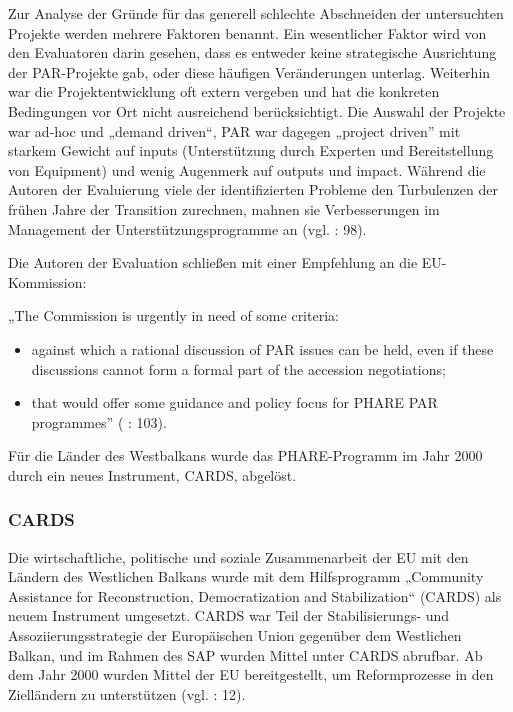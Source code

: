 Zur Analyse der Gründe für das generell schlechte Abschneiden der untersuchten Projekte werden mehrere Faktoren benannt. Ein wesentlicher Faktor wird von den Evaluatoren darin gesehen, dass es entweder keine strategische Ausrichtung der PAR-Projekte gab, oder diese häufigen Veränderungen unterlag. Weiterhin war die Projektentwicklung oft extern vergeben und hat die konkreten Bedingungen vor Ort nicht ausreichend berücksichtigt. Die Auswahl der Projekte war ad-hoc und „demand driven“, PAR war dagegen „project driven” mit starkem Gewicht auf inputs (Unterstützung durch Experten und Bereitstellung von Equipment) und wenig Augenmerk auf outputs und impact. Während die Autoren der Evaluierung viele der identifizierten Probleme den Turbulenzen der frühen Jahre der Transition zurechnen, mahnen sie Verbesserungen im Management der Unterstützungsprogramme an (vgl. \cite{ips} : 98).

Die Autoren der Evaluation schließen mit einer Empfehlung an die EU-Kommission: 

„The Commission is urgently in need of some criteria:
\begin{itemize}
\item against which a rational discussion of PAR issues can be held, even if these discussions cannot form a formal part of the accession negotiations;
\item that would offer some guidance and policy focus for PHARE PAR programmes” (\cite{ips} : 103).
\end{itemize}
Für die Länder des Westbalkans wurde das PHARE-Programm im Jahr 2000 durch ein neues Instrument, CARDS, abgelöst.


\subsubsection{CARDS} 

Die wirtschaftliche, politische und soziale Zusammenarbeit der EU mit den Ländern des Westlichen Balkans wurde mit dem Hilfsprogramm „Community Assistance for Reconstruction, Democratization and Stabilization“ (CARDS) als neuem Instrument umgesetzt. CARDS war Teil der Stabilisierungs- und Assoziierungsstrategie der Europäischen Union gegenüber dem Westlichen Balkan, und im Rahmen des SAP wurden Mittel unter CARDS abrufbar. Ab dem Jahr 2000 wurden Mittel der EU bereitgestellt, um Reformprozesse in den Zielländern zu unterstützen (vgl. \cite{calic01} : 12).\par

